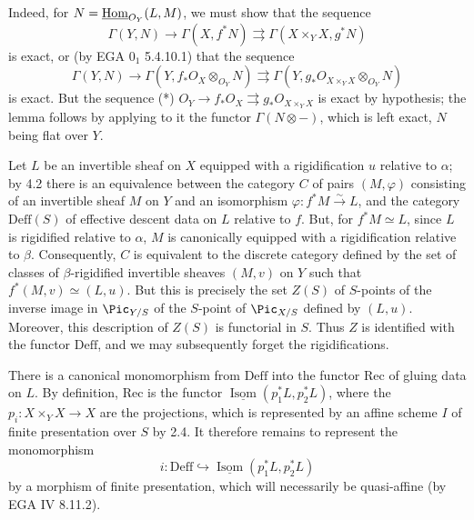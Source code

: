Indeed, for \(N=\underline{\operatorname{Hom}}_{{O}_Y}(L,M)\), we must show that the sequence
\[
  \Gamma(Y,N)\longrightarrow\Gamma(X,f^*N)
  \rightrightarrows
  \Gamma(X\times_YX,g^*N)
\]
is exact, or (by EGA \(0_1\) 5.4.10.1) that the sequence
\[
  \Gamma(Y,N)\longrightarrow\Gamma(Y,f_*{O}_X\otimes_{{O}_Y}N)
  \rightrightarrows
  \Gamma(Y,g_*{O}_{X\times_YX}\otimes_{{O}_Y}N)
\]
is exact. But the sequence (*) \({O}_Y\to f_*{O}_X\rightrightarrows g_*{O}_{X\times_YX}\) is exact by hypothesis; the lemma follows by applying to it the functor \(\Gamma(N\otimes -)\), which is left exact, \(N\) being flat over \(Y\).

Let \(L\) be an invertible sheaf on \(X\) equipped with a rigidification \(u\) relative to \(\alpha\); by 4.2 there is an equivalence between the category \(C\) of pairs \((M,\varphi)\) consisting of an invertible sheaf \(M\) on \(Y\) and an isomorphism \(\varphi:f^*M\xrightarrow{\sim}L\), and the category \(\mathrm{Deff}(S)\) of effective descent data on \(L\) relative to \(f\). But, for \(f^*M\simeq L\), since \(L\) is rigidified relative to \(\alpha\), \(M\) is canonically equipped with a rigidification relative to \(\beta\). Consequently, \(C\) is equivalent to the discrete category defined by the set of classes of \(\beta\)-rigidified invertible sheaves \((M,v)\) on \(Y\) such that \(f^*(M,v)\simeq(L,u)\). But this is precisely the set \(Z(S)\) of \(S\)-points of the inverse image in \(\Pic_{Y/S}\) of the \(S\)-point of \(\Pic_{X/S}\) defined by \((L,u)\). Moreover, this description of \(Z(S)\) is functorial in \(S\). Thus \(Z\) is identified with the functor \(\mathrm{Deff}\), and we may subsequently forget the rigidifications.


\providecommand{\Isom}{\operatorname{Isom}}
\providecommand{\Coker}{\operatorname{Coker}}
\providecommand{\Ker}{\operatorname{Ker}}
\providecommand{\Supp}{\operatorname{Supp}}
\providecommand{\Ass}{\operatorname{Ass}}

%

There is a canonical monomorphism from \(\mathrm{Deff}\) into the functor \(\mathrm{Rec}\) of gluing data on \(L\). By definition, \(\mathrm{Rec}\) is the functor \(\underline{\Isom}(p_1^*L,p_2^*L)\), where the \(p_i:X\times_YX\to X\) are the projections, which is represented by an affine scheme \(I\) of finite presentation over \(S\) by 2.4. It therefore remains to represent the monomorphism
\[
  i:\mathrm{Deff}\hookrightarrow \underline{\Isom}(p_1^*L,p_2^*L)
\]
by a morphism of finite presentation, which will necessarily be quasi-affine (by EGA IV 8.11.2).

